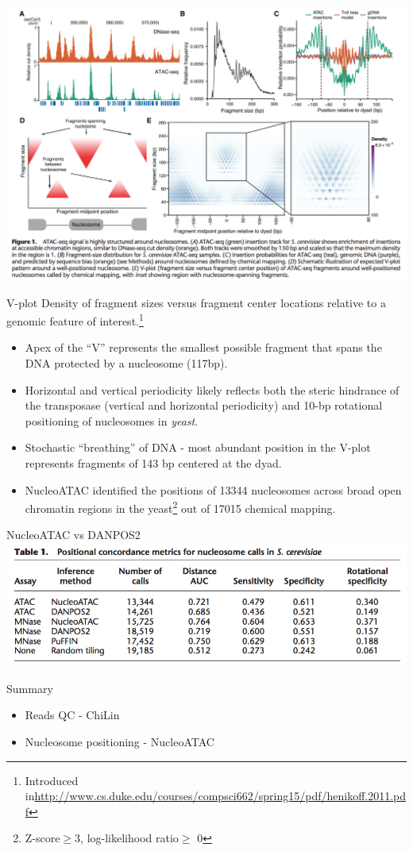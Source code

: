 \documentclass{beamer}
\begin{document}
\begin{frame}
\includegraphics[width=\linewidth]{vshape.png}\\
\end{frame}

\begin{frame}{V-plot}
Density of fragment sizes versus fragment center locations relative to a genomic feature of interest.\footnote{Introduced in\url{http://www.cs.duke.edu/courses/compsci662/spring15/pdf/henikoff.2011.pdf}}
\begin{itemize}
\item Apex of the “V” represents the smallest possible fragment that spans the DNA protected by a nucleosome (117bp).
\item Horizontal and vertical periodicity likely reflects both the steric hindrance of the transposase (vertical and horizontal periodicity) and 10-bp rotational positioning of nucleosomes in \textit{yeast}. 
\item Stochastic “breathing” of DNA - most abundant position in the V-plot represents fragments of 143 bp centered at the dyad.
\item NucleoATAC identified the positions of 13344 nucleosomes across broad open chromatin regions in the yeast\footnote{ Z-score$\geq$3, log-likelihood ratio$\geq$ 0} out of 17015 chemical mapping.
\end{itemize}
\end{frame}

\begin{frame}{NucleoATAC vs DANPOS2}
\includegraphics[width=\linewidth]{nucleoatac_danpose.png}\\
\end{frame}

\begin{frame}{Summary}
\begin{itemize}
\item Reads QC - ChiLin
\item Nucleosome positioning - NucleoATAC
\end{itemize}
\end{frame}

\begin{frame}
\end{frame}
\end{document}
